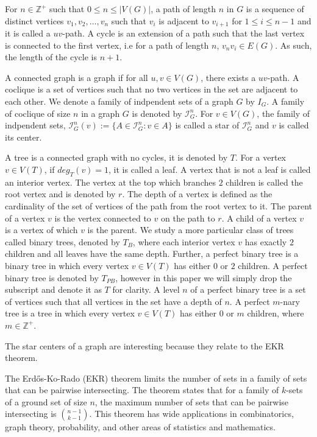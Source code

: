 \documentclass{amsart}
\theoremstyle{definition}
\begin{document}
For $n \in \mathbb{Z^+}$ such that  $0 \leq n \leq |V(G)|$, a path of length $n$ in $G$ is a sequence of distinct vertices $v_1, v_2, \ldots, v_n$ such that $v_i$ is adjacent to $v_{i+1}$ for $1 \leq i \leq n-1$ and it is called a $uv$-path. A cycle is an extension of a path such that the last vertex is connected to the first vertex, i.e for a path of length $n$, $v_nv_i \in E(G)$. As such, the length of the cycle is $n + 1$.

A connected graph is a graph if for all $u,v \in V(G)$, there exists a $uv$-path. A coclique is a set of vertices such that no two vertices in the set are adjacent to each other. We denote a family of indpendent sets of a graph $G$ by $I_G$. A family of coclique of size $n$ in a graph $G$ is denoted by $\mathcal{I}^n_G$. For $v \in V(G)$, the family of indpendent sets, $\mathcal{I}^n_G(v) := \{A \in \mathcal{I}^n_G : v \in A\}$ is called a star of $\mathcal{I}^n_G$ and $v$ is called its center.

A tree is a connected graph with no cycles, it is denoted by $T$. For a vertex $v \in V(T)$, if $deg_T(v) = 1$, it is called a leaf. A vertex that is not a leaf is called an interior vertex. The vertex at the top which branches $2$ children is called the root vertex and is denoted by $r$. The depth of a vertex is defined as the cardinality of the set of vertices of the path from the root vertex to it. The parent of a vertex $v$ is the vertex connected to $v$ on the path to $r$. A child of a vertex $v$ is a vertex of which $v$ is the parent. We study a more particular class of trees called binary trees, denoted by $T_B$, where each interior vertex $v$ has exactly $2$ children and all leaves have the same depth. Further, a perfect binary tree is a binary tree in which every vertex $v \in V(T)$ has either $0$ or $2$ children. A perfect binary tree is denoted by $T_{PB}$, however in this paper we will simply drop the subscript and denote it as $T$ for clarity. A level $n$ of a perfect binary tree is a set of vertices such that all vertices in the set have a depth of $n$. A perfect $m$-nary tree is a tree in which every vertex $v \in V(T)$ has either $0$ or $m$ children, where $m \in \mathbb{Z}^+$.

The star centers of a graph are interesting because they relate to the EKR theorem. 


The Erd\H{o}s-Ko-Rado (EKR) theorem limits the number of sets in a family of sets that can be pairwise intersecting. The theorem states that for a family of $k$-sets of a ground set of size $n$, the maximum number of sets that can be pairwise intersecting is $\binom{n-1}{k-1}$. This theorem has wide applications in combinatorics, graph theory, probability, and other areas of statistics and mathematics.
\end{document}
